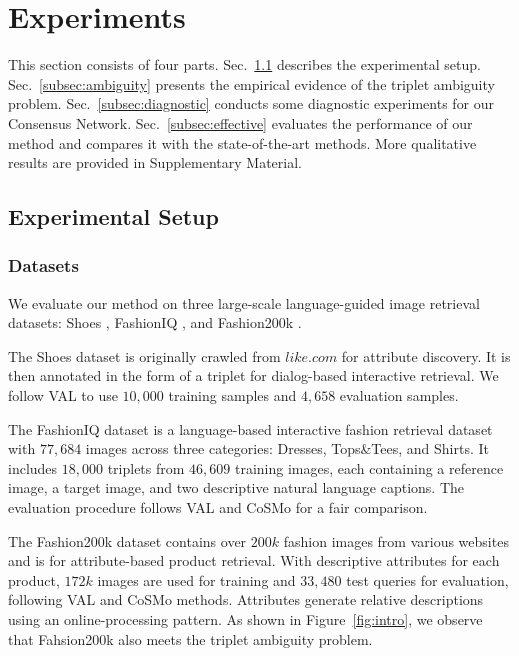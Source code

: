 \documentclass[sigconf]{acmart}
\begin{document}
\section{Experiments} \label{experiments}

This section consists of four parts. Sec.~\ref{subsec:implement} describes the experimental setup. Sec.~\ref{subsec:ambiguity} presents the empirical evidence of the triplet ambiguity problem. Sec.~\ref{subsec:diagnostic} conducts some diagnostic experiments for our Consensus Network. Sec.~\ref{subsec:effective} evaluates the performance of our method and compares it with the state-of-the-art methods. More qualitative results are provided in Supplementary Material.

\subsection{Experimental Setup}
\label{subsec:implement}
\subsubsection{Datasets} 

We evaluate our method on three large-scale language-guided image retrieval datasets: Shoes \cite{berg2010automatic}, FashionIQ \cite{wu2021fashion}, and Fashion200k \cite{vo2019composing}.

The Shoes dataset \cite{berg2010automatic} is originally crawled from $like.com$ for attribute discovery. It is then annotated in the form of a triplet for dialog-based interactive retrieval. We follow VAL \cite{chen2020image} to use $10,000$ training samples and $4,658$ evaluation samples.

The FashionIQ dataset \cite{wu2021fashion} is a language-based interactive fashion retrieval dataset with $77,684$ images across three categories: Dresses, Tops\&Tees, and Shirts. It includes $18,000$ triplets from $46,609$ training images, each containing a reference image, a target image, and two descriptive natural language captions. The evaluation procedure follows VAL  \cite{chen2020image} and CoSMo \cite{lee2021cosmo} for a fair comparison. 

The Fashion200k dataset \cite{han2017automatic} contains over $200k$ fashion images from various websites and is for attribute-based product retrieval. With descriptive attributes for each product, $172k$ images are used for training and $33,480$ test queries for evaluation, following VAL and CoSMo methods. Attributes generate relative descriptions using an online-processing pattern. As shown in Figure~\ref{fig:intro}, we observe that Fahsion200k also meets the triplet ambiguity problem. 
\end{document}
